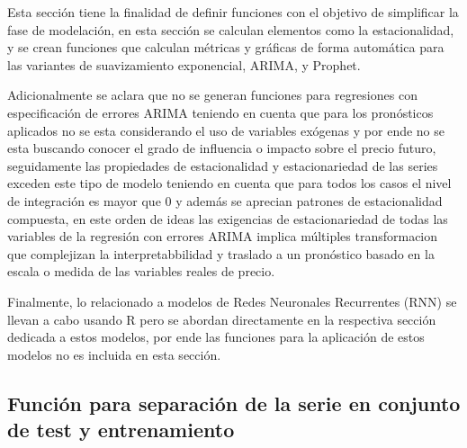 \documentclass[
]{book}
\begin{document}
Esta sección tiene la finalidad de definir funciones con el objetivo de simplificar la fase de modelación, en esta sección se calculan elementos como la estacionalidad, y se crean funciones que calculan métricas y gráficas de forma automática para las variantes de suavizamiento exponencial, ARIMA, y Prophet.

Adicionalmente se aclara que no se generan funciones para regresiones con especificación de errores ARIMA teniendo en cuenta que para los pronósticos aplicados no se esta considerando el uso de variables exógenas y por ende no se esta buscando conocer el grado de influencia o impacto sobre el precio futuro, seguidamente las propiedades de estacionalidad y estacionariedad de las series exceden este tipo de modelo teniendo en cuenta que para todos los casos el nivel de integración es mayor que 0 y además se aprecian patrones de estacionalidad compuesta, en este orden de ideas las exigencias de estacionariedad de todas las variables de la regresión con errores ARIMA implica múltiples transformacion que complejizan la interpretabbilidad y traslado a un pronóstico basado en la escala o medida de las variables reales de precio.

Finalmente, lo relacionado a modelos de Redes Neuronales Recurrentes (RNN) se llevan a cabo usando R pero se abordan directamente en la respectiva sección dedicada a estos modelos, por ende las funciones para la aplicación de estos modelos no es incluida en esta sección.

\hypertarget{funciuxf3n-para-separaciuxf3n-de-la-serie-en-conjunto-de-test-y-entrenamiento}{%
\subsection{Función para separación de la serie en conjunto de test y entrenamiento}\label{funciuxf3n-para-separaciuxf3n-de-la-serie-en-conjunto-de-test-y-entrenamiento}}
\end{document}

